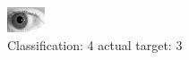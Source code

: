 \begin{figure}[h!]
\begin{center}
\includegraphics[width=0.60\columnwidth]{figures/ID265_class_4_target_3.png}
\end{center}
\caption{ Classification: 4 actual target: 3}
\label{fig:ID265_class_4_target_3}
\end{figure}
